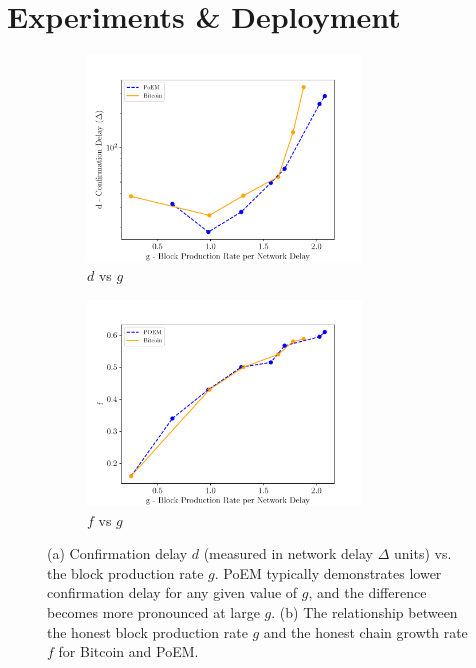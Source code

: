 \section{Experiments \& Deployment}\label{sec:experiments}

\begin{figure}[h]
    \centering
    \begin{subfigure}{0.49\textwidth}
    \centering
    \includegraphics[width = 0.8\textwidth]{figures/dvsg.pdf}
    \caption{$d$ vs $g$}
    \label{fig:dvsg}
    \end{subfigure}
    \begin{subfigure}{0.49\textwidth}
    \centering
    \includegraphics[width = 0.8\textwidth]{figures/fvg.pdf}
    \caption{$f$ vs $g$}
    \label{fig:fg}
    \end{subfigure}
    \caption{(a) Confirmation delay $d$ (measured in network delay $\Delta$ units) vs. the block production rate $g$. PoEM typically demonstrates lower confirmation delay for any given value of $g$, and the difference becomes more pronounced at large $g$. (b) The relationship between the honest block production rate $g$ and the honest chain growth rate $f$ for Bitcoin and PoEM.}
    \label{fig:results}
\end{figure}

